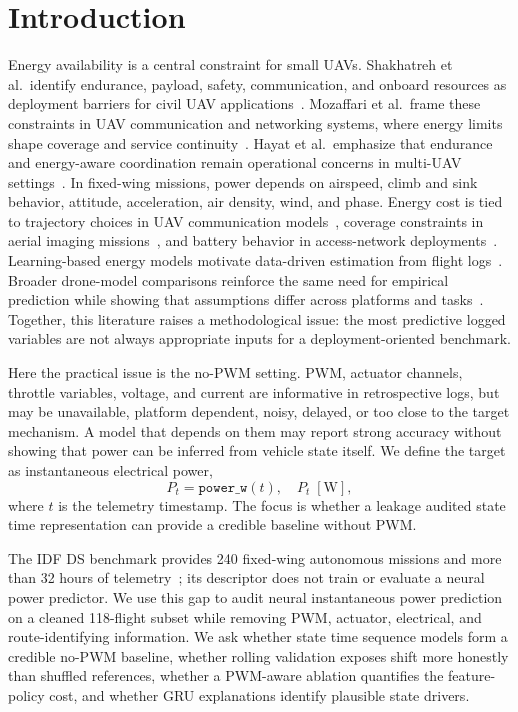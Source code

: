 \documentclass[runningheads,a4paper]{llncs}
\begin{document}
\section{Introduction}

Energy availability is a central constraint for small UAVs. Shakhatreh et al.\ identify endurance, payload, safety, communication, and onboard resources as deployment barriers for civil UAV applications~\cite{shakhatreh2019survey}. Mozaffari et al.\ frame these constraints in UAV communication and networking systems, where energy limits shape coverage and service continuity~\cite{mozaffari2019tutorial}. Hayat et al.\ emphasize that endurance and energy-aware coordination remain operational concerns in multi-UAV settings~\cite{hayat2016survey}. In fixed-wing missions, power depends on airspeed, climb and sink behavior, attitude, acceleration, air density, wind, and phase. Energy cost is tied to trajectory choices in UAV communication models~\cite{zeng2017energy}, coverage constraints in aerial imaging missions~\cite{difranco2016coverage}, and battery behavior in access-network deployments~\cite{abeywickrama2018access}. Learning-based energy models motivate data-driven estimation from flight logs~\cite{gora2022ml}. Broader drone-model comparisons reinforce the same need for empirical prediction while showing that assumptions differ across platforms and tasks~\cite{zhang2021models}. Together, this literature raises a methodological issue: the most predictive logged variables are not always appropriate inputs for a deployment-oriented benchmark.

Here the practical issue is the no-PWM setting. PWM, actuator channels, throttle variables, voltage, and current are informative in retrospective logs, but may be unavailable, platform dependent, noisy, delayed, or too close to the target mechanism. A model that depends on them may report strong accuracy without showing that power can be inferred from vehicle state itself. We define the target as instantaneous electrical power,
\begin{equation}
  P_t = \texttt{power\_w}(t), \quad P_t \; [\mathrm{W}], \label{eq:target}
\end{equation}
where $t$ is the telemetry timestamp. The focus is whether a leakage audited state time representation can provide a credible baseline without PWM.

The IDF DS benchmark provides 240 fixed-wing autonomous missions and more than 32 hours of telemetry~\cite{garcia2026idfds}; its descriptor does not train or evaluate a neural power predictor. We use this gap to audit neural instantaneous power prediction on a cleaned 118-flight subset while removing PWM, actuator, electrical, and route-identifying information. We ask whether state time sequence models form a credible no-PWM baseline, whether rolling validation exposes shift more honestly than shuffled references, whether a PWM-aware ablation quantifies the feature-policy cost, and whether GRU explanations identify plausible state drivers.
\end{document}
